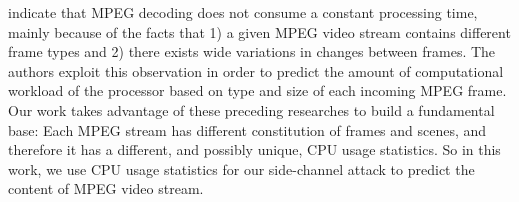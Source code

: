 \cite{Bavier98predictingmpeg}\cite{DVFS} indicate that MPEG decoding does not consume a constant processing time, mainly because of the facts that 1) a given MPEG video stream contains different frame types and 2) there exists wide variations in changes between frames. 
The authors exploit this observation in order to predict the amount of computational workload of the processor based on type and size of each incoming MPEG frame.
Our work takes advantage of these preceding researches to build a fundamental base: Each MPEG stream has different constitution of frames and scenes, and therefore it has a different, and possibly unique, CPU usage statistics. 
So in this work, we use CPU usage statistics for our side-channel attack to predict the content of MPEG video stream. 



\begin{comment}

\cite{MPEG} MPEG terminology. \term{I-frame}, \term{P-frame}, \term{B-frame}. (from DVFS 2.2). 
The authors empirically studied the relationship between the decoding time and the data size of each frame.  (from DVFS 2.3). 

\cite{DVFS}  predicts the amount of computational workload of ARM processor based on the type of each incoming frame.
IDCT and Reconstruction take more than half of CPU time. 
IDCT is CPU intensive and its computation time is dependent on frmae type.


and more citations show a process without admin privilege can monitor other process' information through \term{proc}. 

shows CPU usage pattern can be used for side-channel attack. 

shows a person's preference on movies can reveal sensitive information such as ....

\end{comment}